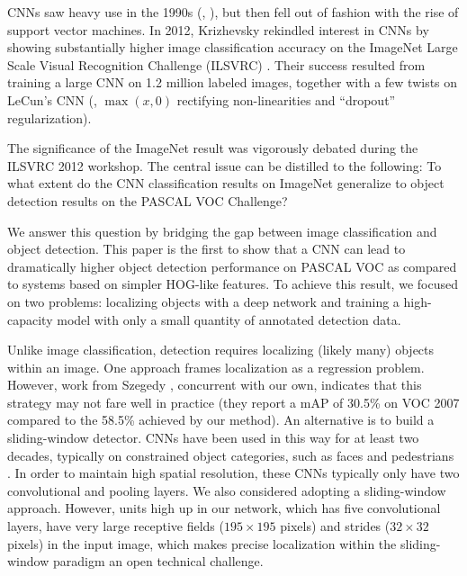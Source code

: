 CNNs saw heavy use in the 1990s (\eg, \cite{lecun-98}), but then fell out of fashion with the rise of support vector machines.
In 2012, Krizhevsky \etal \cite{krizhevsky2012imagenet} rekindled interest
in CNNs by showing substantially higher image classification accuracy on the ImageNet Large Scale Visual Recognition Challenge (ILSVRC) \cite{ILSVRC12,imagenet_cvpr09}.
Their success resulted from training a large CNN on 1.2 million labeled images, together with a few twists on LeCun's CNN (\eg, $\max(x,0)$ rectifying non-linearities and ``dropout'' regularization).

The significance of the ImageNet result was vigorously debated during the ILSVRC 2012 workshop.
The central issue can be distilled to the following: To what
extent do the CNN classification results on ImageNet generalize
to object detection results on the PASCAL VOC Challenge?

We answer this question by bridging the gap between image classification and object detection.
This paper is the first to show that a CNN can lead to dramatically higher object detection performance on PASCAL VOC as compared to systems based on simpler HOG-like features.
To achieve this result, we focused on two problems: localizing objects with a deep network and training a high-capacity model with only a small quantity of annotated detection data.

Unlike image classification, detection requires localizing (likely many) objects within an image.
One approach frames localization as a regression problem.
However, work from Szegedy \etal \cite{szegedy2013deep}, concurrent with our own, 
indicates that this strategy may not fare well in practice (they report a mAP of 30.5\% on VOC 2007 compared to the 58.5\% achieved by our method).
An alternative is to build a sliding-window detector.
CNNs have been used in this way for at least two decades, typically on constrained object categories, such as faces \cite{rowley1998neural,lecun94} and pedestrians \cite{sermanetCVPR13}.
In order to maintain high spatial resolution, these CNNs typically only have two convolutional and pooling layers.
We also considered adopting a sliding-window approach.
However, units high up in our network, which has five convolutional layers, have very large receptive fields ($195 \times 195$ pixels) and strides ($32 \times 32$ pixels) in the input image, which makes precise localization within the sliding-window paradigm an open technical challenge.

